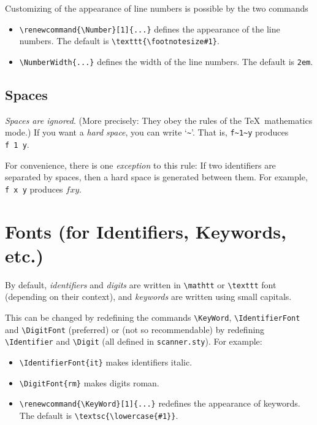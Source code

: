 Customizing of the appearance of line numbers is possible by the two
commands

\begin{itemize}
  \item \verb+\renewcommand{\Number}[1]{...}+ defines the appearance of
    the line numbers. The default is \verb+\texttt{\footnotesize#1}+.
  \item \verb+\NumberWidth{...}+ defines the width of the line numbers. The
    default is \texttt{2em}.
\end{itemize}



\subsection{Spaces}

\emph{Spaces are ignored}. (More precisely: They obey the rules of
the \TeX\ mathematics mode.) If you want a \emph{hard space}, you can write
`\verb=~='. That is, \verb=f~1~y= produces \texttt{f~1~y}.

For convenience, there is one \emph{exception} to this rule: If two
identifiers are separated by spaces, then a hard space is generated between
them. For example, \verb+f x y+ produces \(f x y\).







\section{Fonts (for Identifiers, Keywords, etc.)}

By default, \emph{identifiers} and \emph{digits} are written in
\verb+\mathtt+ or \verb+\texttt+ font (depending on their context), and
\emph{keywords} are written using small capitals.

This can be changed by redefining the commands \verb+\KeyWord+,
\verb+\IdentifierFont+ and \verb+\DigitFont+ (preferred) or (not so
recommendable) by redefining \verb+\Identifier+ and \verb+\Digit+ (all
defined in \texttt{scanner.sty}). For example:

\begin{itemize}
  \item \verb+\IdentifierFont{it}+ makes identifiers italic.
  \item \verb+\DigitFont{rm}+ makes digits roman.
  \item \verb+\renewcommand{\KeyWord}[1]{...}+ redefines the appearance of
    keywords. The default is \verb+\textsc{\lowercase{#1}}+.
\end{itemize}


